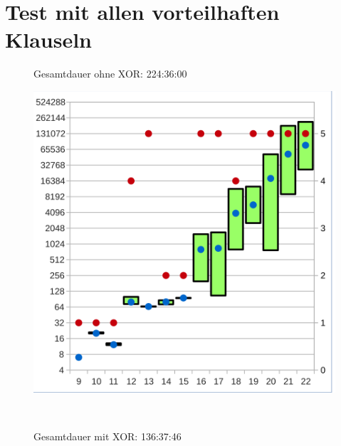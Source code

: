 \section{Test mit allen vorteilhaften Klauseln}


\begin{figure}[!h]
  \centering
  \begin{minipage}[c]{0.45\textwidth}
  \begin{flushleft}Gesamtdauer ohne XOR: 224:36:00\end{flushleft}
  \includegraphics[scale=0.55]{images/data_final_knf}
  \end{minipage}
  \begin{minipage}[c]{0.09\textwidth}
  ~~
  \end{minipage}
  \begin{minipage}[c]{0.45\textwidth}
  \begin{flushleft}Gesamtdauer mit XOR: 136:37:46\end{flushleft}

\end{minipage}
\end{figure}
